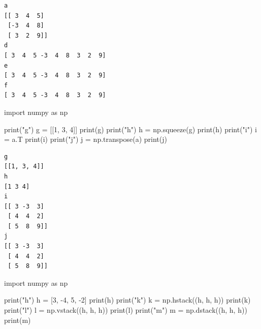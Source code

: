 \documentclass[
  polish,
  letterpaper,
  DIV=11,
  numbers=noendperiod]{scrreprt}
\newenvironment{Shaded}{\begin{snugshade}}{\end{snugshade}}
\newcommand{\BuiltInTok}[1]{\textcolor[rgb]{0.00,0.23,0.31}{#1}}
\newcommand{\DecValTok}[1]{\textcolor[rgb]{0.68,0.00,0.00}{#1}}
\newcommand{\ImportTok}[1]{\textcolor[rgb]{0.00,0.46,0.62}{#1}}
\newcommand{\NormalTok}[1]{\textcolor[rgb]{0.00,0.23,0.31}{#1}}
\newcommand{\OperatorTok}[1]{\textcolor[rgb]{0.37,0.37,0.37}{#1}}
\newcommand{\StringTok}[1]{\textcolor[rgb]{0.13,0.47,0.30}{#1}}
\begin{document}
\begin{verbatim}
a
[[ 3  4  5]
 [-3  4  8]
 [ 3  2  9]]
d
[ 3  4  5 -3  4  8  3  2  9]
e
[ 3  4  5 -3  4  8  3  2  9]
f
[ 3  4  5 -3  4  8  3  2  9]
\end{verbatim}

\begin{Shaded}
\begin{Highlighting}[]
\ImportTok{import}\NormalTok{ numpy }\ImportTok{as}\NormalTok{ np}

\BuiltInTok{print}\NormalTok{(}\StringTok{"g"}\NormalTok{)}
\NormalTok{g }\OperatorTok{=}\NormalTok{ [[}\DecValTok{1}\NormalTok{, }\DecValTok{3}\NormalTok{, }\DecValTok{4}\NormalTok{]]}
\BuiltInTok{print}\NormalTok{(g)}
\BuiltInTok{print}\NormalTok{(}\StringTok{"h"}\NormalTok{)}
\NormalTok{h }\OperatorTok{=}\NormalTok{ np.squeeze(g)}
\BuiltInTok{print}\NormalTok{(h)}
\BuiltInTok{print}\NormalTok{(}\StringTok{"i"}\NormalTok{)}
\NormalTok{i }\OperatorTok{=}\NormalTok{ a.T}
\BuiltInTok{print}\NormalTok{(i)}
\BuiltInTok{print}\NormalTok{(}\StringTok{"j"}\NormalTok{)}
\NormalTok{j }\OperatorTok{=}\NormalTok{ np.transpose(a)}
\BuiltInTok{print}\NormalTok{(j)}
\end{Highlighting}
\end{Shaded}

\begin{verbatim}
g
[[1, 3, 4]]
h
[1 3 4]
i
[[ 3 -3  3]
 [ 4  4  2]
 [ 5  8  9]]
j
[[ 3 -3  3]
 [ 4  4  2]
 [ 5  8  9]]
\end{verbatim}

\begin{Shaded}
\begin{Highlighting}[]
\ImportTok{import}\NormalTok{ numpy }\ImportTok{as}\NormalTok{ np}

\BuiltInTok{print}\NormalTok{(}\StringTok{"h"}\NormalTok{)}
\NormalTok{h }\OperatorTok{=}\NormalTok{ [}\DecValTok{3}\NormalTok{, }\OperatorTok{{-}}\DecValTok{4}\NormalTok{, }\DecValTok{5}\NormalTok{, }\OperatorTok{{-}}\DecValTok{2}\NormalTok{]}
\BuiltInTok{print}\NormalTok{(h)}
\BuiltInTok{print}\NormalTok{(}\StringTok{"k"}\NormalTok{)}
\NormalTok{k }\OperatorTok{=}\NormalTok{ np.hstack((h, h, h))}
\BuiltInTok{print}\NormalTok{(k)}
\BuiltInTok{print}\NormalTok{(}\StringTok{"l"}\NormalTok{)}
\NormalTok{l }\OperatorTok{=}\NormalTok{ np.vstack((h, h, h))}
\BuiltInTok{print}\NormalTok{(l)}
\BuiltInTok{print}\NormalTok{(}\StringTok{"m"}\NormalTok{)}
\NormalTok{m }\OperatorTok{=}\NormalTok{ np.dstack((h, h, h))}
\BuiltInTok{print}\NormalTok{(m)}
\end{Highlighting}
\end{Shaded}
\end{document}
